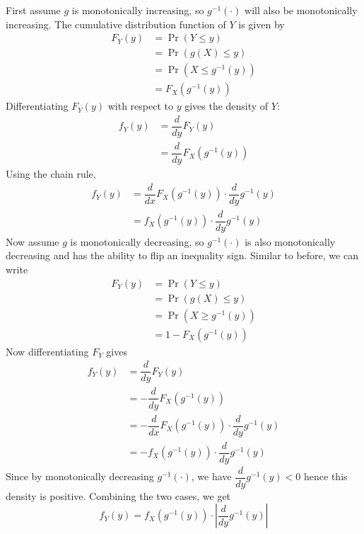 \documentclass[11pt]{report} %
\begin{document}
First assume $g$ is monotonically increasing, so $g^{-1}\left(\cdot\right)$ will also be monotonically increasing. The cumulative distribution function of $Y$ is given by
\begin{align}
F_{Y}\left(y\right) &= \operatorname{Pr}\left(Y \leq y\right) \\
&= \operatorname{Pr}\left(g\left(X\right) \leq y\right) \\
&= \operatorname{Pr}\left(X \leq g^{-1}\left(y\right)\right) \\
&= F_{X}\left(g^{-1}\left(y\right)\right)
\end{align}
Differentiating $F_{Y}\left(y\right)$ with respect to $y$ gives the density of $Y$:
\begin{align}
f_{Y}\left(y\right) &= \dfrac{d}{dy}F_{Y}\left(y\right)\\
&= \dfrac{d}{dy}F_{X}\left(g^{-1}\left(y\right)\right)
\end{align}
Using the chain rule,
\begin{align}
f_{Y}\left(y\right) &= \dfrac{d}{dx}F_{X}\left(g^{-1}\left(y\right)\right)\cdot\dfrac{d}{dy}g^{-1}\left(y\right) \\
&= f_{X}\left(g^{-1}\left(y\right)\right)\cdot\dfrac{d}{dy}g^{-1}\left(y\right)
\end{align}
Now assume $g$ is monotonically decreasing, so $g^{-1}\left(\cdot\right)$ is also monotonically decreasing and has the ability to flip an inequality sign. Similar to before, we can write
\begin{align}
F_{Y}\left(y\right) &= \operatorname{Pr}\left(Y \leq y\right) \\
&= \operatorname{Pr}\left(g\left(X\right) \leq y\right) \\
&= \operatorname{Pr}\left(X \geq g^{-1}\left(y\right)\right) \\
&= 1 - F_{X}\left(g^{-1}\left(y\right)\right)
\end{align}
Now differentiating $F_{Y}$ gives 
\begin{align}
f_{Y}\left(y\right) &= \dfrac{d}{dy}F_{Y}\left(y\right) \\
&= -\dfrac{d}{dy}F_{X}\left(g^{-1}\left(y\right)\right) \\
&= -\dfrac{d}{dx}F_{X}\left(g^{-1}\left(y\right)\right)\cdot\dfrac{d}{dy}g^{-1}\left(y\right) \\
&= -f_{X}\left(g^{-1}\left(y\right)\right)\cdot\dfrac{d}{dy}g^{-1}\left(y\right)
\end{align}
Since by monotonically decreasing $g^{-1}\left(\cdot\right)$, we have $\dfrac{d}{dy}g^{-1}\left(y\right) < 0$ hence this density is positive. Combining the two cases, we get
\begin{equation}
f_{Y}\left(y\right) =  f_{X}\left(g^{-1}\left(y\right)\right)\cdot\left|\dfrac{d}{dy}g^{-1}\left(y\right)\right|
\end{equation}
\end{document}
